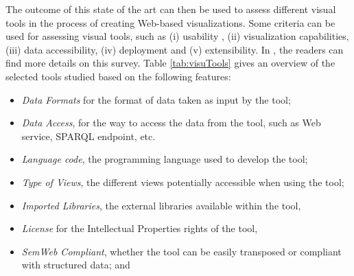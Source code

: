 The outcome of this state of the art can then be used to assess different visual tools in the process of creating Web-based visualizations. Some criteria can be used for assessing visual tools, such as (i) usability , (ii) visualization capabilities, (iii) data accessibility, (iv) deployment and (v) extensibility. In \cite{deliverable2012b}, the readers can find more details on this survey. Table \ref{tab:visuTools} gives an overview of the selected tools studied based on the following features:
\begin{itemize}
\item \textit{Data Formats} for the format of data taken as input by the tool;
\item \textit{Data Access}, for the way to access the data from the tool, such as Web service, SPARQL endpoint, etc.
\item \textit{Language code}, the programming language used to develop the tool;
\item \textit{Type of Views}, the different views potentially accessible when using the tool;
\item \textit{Imported Libraries}, the external libraries available within the tool,
\item \textit{License} for the Intellectual Properties rights of the tool,
\item \textit{SemWeb Compliant}, whether the tool can be easily transposed or compliant with structured data; and

\end{itemize}


